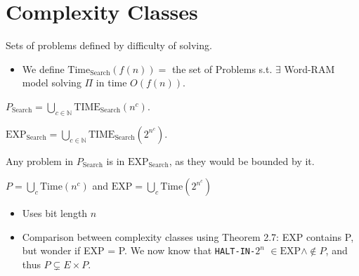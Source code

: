 \documentclass[11pt]{scrartcl}
\theoremstyle{dotlessP}
\theoremstyle{dotlessN}
\newcommand{\nats}{\mathbb{N}}
\begin{document}
\section{Complexity Classes}
\begin{definition}
	Sets of problems defined by difficulty of solving.
\end{definition}
\begin{itemize}
	\item We define $\text{Time}_\text{Search}(f(n)) =$ the set of Problems s.t. $\exists$ Word-RAM model solving $\Pi$ in time $O(f(n))$.
\end{itemize}
\begin{definition}
	 $P_\text{Search} = \displaystyle\bigcup_{c \in \nats} \text{TIME}_\text{Search}(n^c)$.
\end{definition}
\begin{definition}
	 $\text{EXP}_\text{Search} = \displaystyle\bigcup_{c \in \nats}\text{TIME}_\text{Search}(2^{n^c})$.
\end{definition}
\begin{remark}
	Any problem in $P_\text{Search}$ is in $\text{EXP}_\text{Search}$, as they would be bounded by it.
\end{remark}
\begin{definition}
	$P = \displaystyle\bigcup_c \text{Time}(n^c)$ and
	$\text{EXP} = \displaystyle\bigcup_c \text{Time}(2^{n^c})$
\end{definition}
\begin{itemize}
	\item Uses bit length $n$
\item Comparison between complexity classes using Theorem 2.7: EXP contains P, but wonder if EXP = P. We now know that \texttt{HALT-IN-$2^n$} $\in \text{EXP} \land \not\in P$, and thus $P \subsetneq E \times P$.
\end{itemize}
\end{document}
